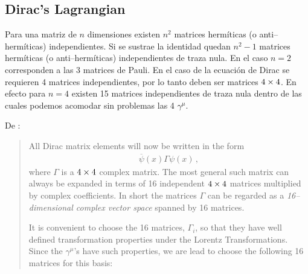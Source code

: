 \subsection{Dirac's Lagrangian}
\label{sec:diracs-lagrangian}

Para una matriz de $n$ dimensiones existen $n^2$ matrices hermíticas (o anti--hermíticas) independientes. Si se sustrae la identidad quedan $n^2-1$ matrices hermíticas (o anti--hermíticas) independientes de traza nula. En el caso $n=2$ corresponden a las 3 matrices de Pauli. En el caso de la ecuación de Dirac se requieren 4 matrices independientes, por lo tanto deben ser matrices $4\times 4$. En efecto para $n=4$ existen 15 matrices independientes de traza nula dentro de las cuales podemos acomodar sin problemas las 4 $\gamma^\mu$. 

De \cite{Gross:1993}:
\begin{quote}
  All Dirac matrix elements will now be written in the form
  \begin{align}
    \overline{\psi}(x)\Gamma\psi(x)\,,
  \end{align}
where $\Gamma$ is a $4\times 4$ complex matrix. The most general such matrix can always be expanded in terms of 16 independent $4\times 4$ matrices multiplied by complex coefficients. In short the matrices $\Gamma$ can be regarded as a \emph{16--dimensional complex vector space} spanned by 16 matrices.

It is convenient to choose the 16 matrices, $\Gamma_i$, so that they have well defined transformation properties under the Lorentz Transformations. Since the $\gamma^\mu$'s have such properties, we are lead to choose the following 16 matrices for this basis:
\end{quote}


